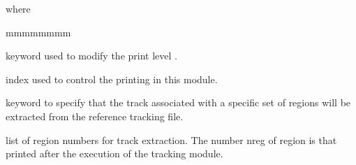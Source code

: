 \noindent
 where

\begin{ListeDeDescription}{mmmmmmmm}   

\item[\moc{EDIT}] keyword used to modify the print level .

\item[\dusa{iprint}] index used to control the printing in this module.

\item[\moc{EXTR}] keyword to specify that the track associated with a specific set of regions will be extracted from
the reference tracking file.

\item[\dusa{iext}] list of region numbers for track extraction. The number nreg of region is that printed after the execution
of the tracking module.

\end{ListeDeDescription}

\eject
